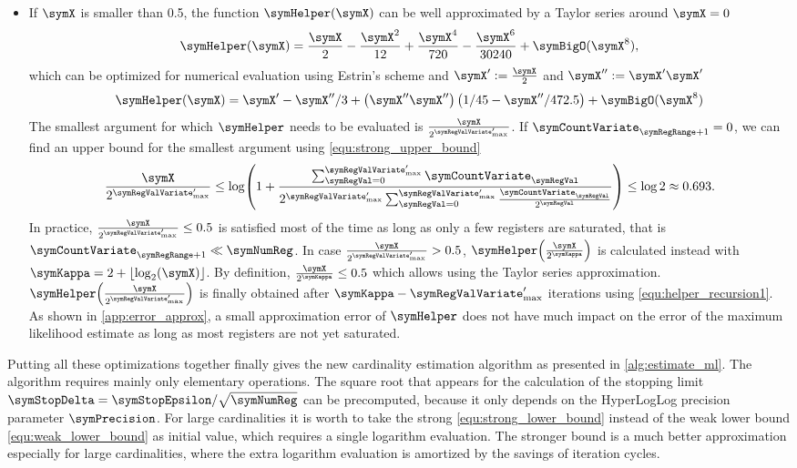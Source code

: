 \documentclass[a4paper]{scrartcl}
\begin{document}
\begin{itemize}
\item If $\symX$ is smaller than 0.5, the function $\symHelper(\symX)$ can be well approximated by a Taylor series around $\symX=0$
\begin{equation}
\symHelper(\symX)
=
\frac{\symX}{2} - \frac{\symX^2}{12} +\frac{\symX^4}{720}-\frac{\symX^6}{30240} + \symBigO(\symX^{8}),
\end{equation}
which can be optimized for numerical evaluation using Estrin's scheme and $\symX' := \frac{\symX}{2}$ and $\symX'' := \symX' \symX'$
\begin{equation}
\label{equ:taylor}
\symHelper(\symX)
=
\symX' - \symX''/3 + \left(\symX'' \symX''\right)\left(1/45-\symX''/472.5\right)
+ \symBigO(\symX^{8})
\end{equation}
The smallest argument for which $\symHelper$ needs to be evaluated is $\frac{\symX}{2^{\symRegValVariate'_\text{max}}}$. If 
$\symCountVariate_{\symRegRange+1}=0$, we can find an upper bound for the smallest argument using \eqref{equ:strong_upper_bound}
\begin{equation}
\frac{\symX}{2^{\symRegValVariate'_\text{max}}} 
\leq
\log\!\left(
1+
\frac{\sum_{\symRegVal=0}^{\symRegValVariate'_\text{max}}\symCountVariate_\symRegVal}
{
2^{\symRegValVariate'_\text{max}}
\sum_{\symRegVal=0}^{\symRegValVariate'_\text{max}}
\frac{\symCountVariate_\symRegVal}{2^\symRegVal}
}
\right)
\leq \log 2 \approx 0.693.
\end{equation}
In practice, $\frac{\symX}{2^{\symRegValVariate'_\text{max}}}\leq0.5$ is satisfied most of the time as long as only a few registers are saturated, that is $\symCountVariate_{\symRegRange+1}\ll \symNumReg$. In case $\frac{\symX}{2^{\symRegValVariate'_\text{max}}} > 0.5$, $\symHelper\!\left(\frac{\symX}{2^{\symKappa}}\right)$ is calculated instead with $\symKappa = 2+\lfloor\log_2(\symX)\rfloor$. By definition, $\frac{\symX}{2^{\symKappa}}\leq 0.5$ which allows using the Taylor series approximation. $\symHelper\!\left(\frac{\symX}{2^{\symRegValVariate'_\text{max}}}\right)$ is finally obtained after $\symKappa -\symRegValVariate'_\text{max}$ iterations using \eqref{equ:helper_recursion1}. As shown in \cref{app:error_approx}, a small approximation error of $\symHelper$ does not have much impact on the error of the maximum likelihood estimate as long as most registers are not yet saturated.
\end{itemize}

Putting all these optimizations together finally gives the new cardinality estimation algorithm as presented in \cref{alg:estimate_ml}. The algorithm requires mainly only elementary operations. The square root that appears for the calculation of the stopping limit $\symStopDelta=\symStopEpsilon/\sqrt{\symNumReg}$ can be precomputed, because it only depends on the HyperLogLog precision parameter $\symPrecision$. For large cardinalities it is worth to take the strong \eqref{equ:strong_lower_bound} instead of the weak lower bound \eqref{equ:weak_lower_bound} as initial value, which requires a single logarithm evaluation. The stronger bound is a much better approximation especially for large cardinalities, where the extra logarithm evaluation is amortized by the savings of iteration cycles.
\end{document}
